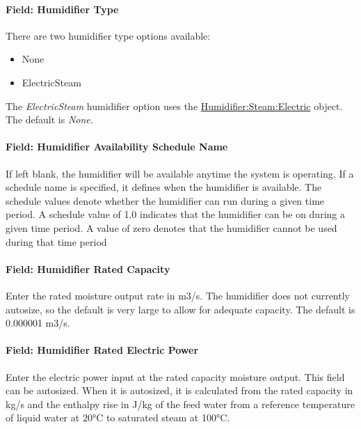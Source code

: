 \paragraph{Field: Humidifier Type}\label{field-humidifier-type-2}

There are two humidifier type options available:

\begin{itemize}
\item
  None
\item
  ElectricSteam
\end{itemize}

The \emph{ElectricSteam} humidifier option uses the \hyperref[humidifiersteamelectric]{Humidifier:Steam:Electric} object. The default is \emph{None.}

\paragraph{Field: Humidifier Availability Schedule Name}\label{field-humidifier-availability-schedule-name-2}

If left blank, the humidifier will be available anytime the system is operating. If a schedule name is specified, it defines when the humidifier is available. The schedule values denote whether the humidifier can run during a given time period. A schedule value of 1.0 indicates that the humidifier can be on during a given time period. A value of zero denotes that the humidifier cannot be used during that time period

\paragraph{Field: Humidifier Rated Capacity}\label{field-humidifier-rated-capacity-2}

Enter the rated moisture output rate in m3/s. The humidifier does not currently autosize, so the default is very large to allow for adequate capacity. The default is 0.000001 m3/s.

\paragraph{Field: Humidifier Rated Electric Power}\label{field-humidifier-rated-electric-power-2}

Enter the electric power input at the rated capacity moisture output. This field can be autosized. When it is autosized, it is calculated from the rated capacity in kg/s and the enthalpy rise in J/kg of the feed water from a reference temperature of liquid water at 20°C to saturated steam at 100°C.

